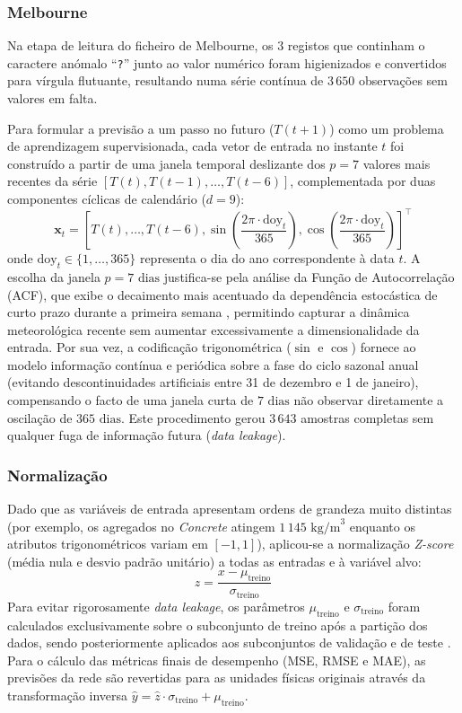 \documentclass[conference]{IEEEtran}
\begin{document}
\subsubsection{Melbourne}
Na etapa de leitura do ficheiro de Melbourne, os $3$ registos que continham o caractere anómalo ``\texttt{?}'' junto ao valor numérico foram higienizados e convertidos para vírgula flutuante, resultando numa série contínua de $3\,650$ observações sem valores em falta.

Para formular a previsão a um passo no futuro ($T(t+1)$) como um problema de aprendizagem supervisionada, cada vetor de entrada no instante $t$ foi construído a partir de uma janela temporal deslizante dos $p = 7$ valores mais recentes da série $[T(t), T(t-1), \dots, T(t-6)]$, complementada por duas componentes cíclicas de calendário ($d = 9$):
\begin{equation}
\mathbf{x}_t = \left[ T(t), \dots, T(t-6), \sin\!\left(\frac{2\pi \cdot \text{doy}_t}{365}\right), \cos\!\left(\frac{2\pi \cdot \text{doy}_t}{365}\right) \right]^\top
\end{equation}
onde $\text{doy}_t \in \{1, \dots, 365\}$ representa o dia do ano correspondente à data $t$. A escolha da janela $p = 7\text{ dias}$ justifica-se pela análise da Função de Autocorrelação (ACF), que exibe o decaimento mais acentuado da dependência estocástica de curto prazo durante a primeira semana \cite{b10}, permitindo capturar a dinâmica meteorológica recente sem aumentar excessivamente a dimensionalidade da entrada. Por sua vez, a codificação trigonométrica ($\sin$ e $\cos$) fornece ao modelo informação contínua e periódica sobre a fase do ciclo sazonal anual (evitando descontinuidades artificiais entre 31 de dezembro e 1 de janeiro), compensando o facto de uma janela curta de $7\text{ dias}$ não observar diretamente a oscilação de $365\text{ dias}$. Este procedimento gerou $3\,643$ amostras completas sem qualquer fuga de informação futura (\textit{data leakage}).

\subsubsection{Normalização}
Dado que as variáveis de entrada apresentam ordens de grandeza muito distintas (por exemplo, os agregados no \textit{Concrete} atingem $1\,145\text{ kg/m}^3$ enquanto os atributos trigonométricos variam em $[-1, 1]$), aplicou-se a normalização \textit{Z-score} (média nula e desvio padrão unitário) a todas as entradas e à variável alvo:
\begin{equation}
z = \frac{x - \mu_{\text{treino}}}{\sigma_{\text{treino}}}
\end{equation}
Para evitar rigorosamente \textit{data leakage}, os parâmetros $\mu_{\text{treino}}$ e $\sigma_{\text{treino}}$ foram calculados exclusivamente sobre o subconjunto de treino após a partição dos dados, sendo posteriormente aplicados aos subconjuntos de validação e de teste \cite{b1}. Para o cálculo das métricas finais de desempenho (MSE, RMSE e MAE), as previsões da rede são revertidas para as unidades físicas originais através da transformação inversa $\hat{y} = \hat{z} \cdot \sigma_{\text{treino}} + \mu_{\text{treino}}$.
\end{document}
